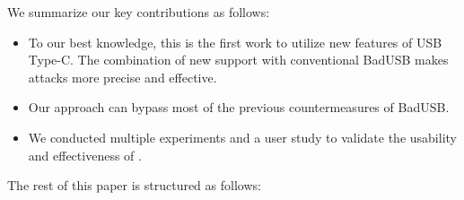 We summarize our key contributions as follows:
\begin{itemize}
	\item To our best knowledge, this is the first work to utilize new features of USB Type-C.
	The combination of new support with conventional BadUSB makes attacks more precise and effective.
	\item Our approach can bypass most of the previous countermeasures of BadUSB.
	\item We conducted multiple experiments and a user study to validate the usability and effectiveness of \tool. 
\end{itemize}

The rest of this paper is structured as follows:














